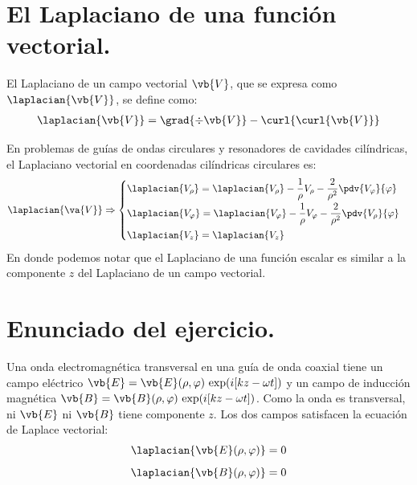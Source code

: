 \section{El Laplaciano de una función vectorial.}

El Laplaciano de un campo vectorial $\vb{V}$, que se expresa como $\laplacian{\vb{V}}$, se define como:
\begin{align*}
\laplacian{\vb{V}} = \grad{\div{\vb{V}}} - \curl{\curl{\vb{V}}}
\end{align*}

En problemas de guías de ondas circulares y resonadores de cavidades cilíndricas, el Laplaciano vectorial en coordenadas cilíndricas circulares es:
\begin{align*}
\laplacian{\va{V}} \Rightarrow \begin{cases}
\laplacian{V_{\rho}} = \laplacian{V_{\rho}} - \dfrac{1}{\rho} V_{\rho} - \dfrac{2}{\rho^{2}} \displaystyle \pdv{V_{\varphi}}{\varphi} \\[0.75em]
\laplacian{V_{\varphi}} = \laplacian{V_{\varphi}} - \dfrac{1}{\rho} V_{\varphi} - \dfrac{2}{\rho^{2}} \displaystyle \pdv{V_{\rho}}{\varphi} \\[0.75em]
\laplacian{V_{z}} = \laplacian{V_{z}}
\end{cases}
\end{align*}
En donde podemos notar que el Laplaciano de una función escalar es similar a la componente $z$ del Laplaciano de un campo vectorial.

\section{Enunciado del ejercicio.}

Una onda electromagnética transversal en una guía de onda coaxial tiene un campo eléctrico $\vb{E} = \vb{E} (\rho, \varphi) \, \exp(i [k z - \omega t])$ y un campo de inducción magnética $\vb{B} = \vb{B} (\rho, \varphi) \, \exp(i [k z - \omega t])$. Como la onda es transversal, ni $\vb{E}$ ni $\vb{B}$ tiene componente $z$. Los dos campos satisfacen la ecuación de Laplace vectorial:
\begin{align*}
\laplacian{\vb{E} (\rho, \varphi)} &= 0 \\[0.5em]
\laplacian{\vb{B} (\rho, \varphi)} &= 0
\end{align*}

